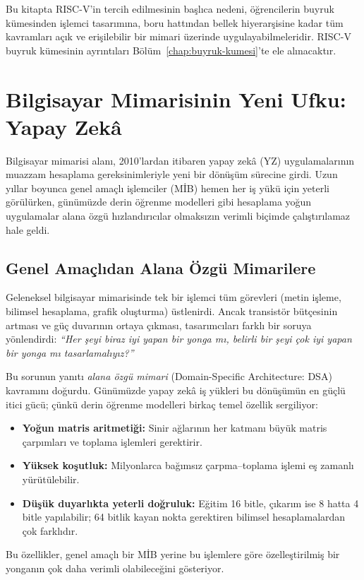 Bu kitapta RISC-V'in tercih edilmesinin başlıca nedeni, öğrencilerin buyruk kümesinden işlemci tasarımına, boru hattından bellek hiyerarşisine kadar tüm kavramları açık ve erişilebilir bir mimari üzerinde uygulayabilmeleridir. RISC-V buyruk kümesinin ayrıntıları Bölüm~\ref{chap:buyruk-kumesi}'te ele alınacaktır.


\section{Bilgisayar Mimarisinin Yeni Ufku: Yapay Zekâ}
\label{sec:yapay-zeka-ufku}

Bilgisayar mimarisi alanı, 2010'lardan itibaren yapay zekâ (YZ) uygulamalarının muazzam hesaplama gereksinimleriyle yeni bir dönüşüm sürecine girdi. Uzun yıllar boyunca genel amaçlı işlemciler (MİB) hemen her iş yükü için yeterli görülürken, günümüzde derin öğrenme modelleri gibi hesaplama yoğun uygulamalar alana özgü hızlandırıcılar olmaksızın verimli biçimde çalıştırılamaz hale geldi.


\subsection{Genel Amaçlıdan Alana Özgü Mimarilere}
\label{sec:genel-alana-ozgu}

Geleneksel bilgisayar mimarisinde tek bir işlemci tüm görevleri (metin işleme, bilimsel hesaplama, grafik oluşturma) üstlenirdi. Ancak transistör bütçesinin artması ve güç duvarının ortaya çıkması, tasarımcıları farklı bir soruya yönlendirdi: \emph{``Her şeyi biraz iyi yapan bir yonga mı, belirli bir şeyi çok iyi yapan bir yonga mı tasarlamalıyız?''}

Bu sorunun yanıtı \emph{alana özgü mimari} (Domain-Specific Architecture: DSA) kavramını doğurdu. Günümüzde yapay zekâ iş yükleri bu dönüşümün en güçlü itici gücü; çünkü derin öğrenme modelleri birkaç temel özellik sergiliyor:
\begin{itemize}
    \item \textbf{Yoğun matris aritmetiği:} Sinir ağlarının her katmanı büyük matris çarpımları ve toplama işlemleri gerektirir.
    \item \textbf{Yüksek koşutluk:} Milyonlarca bağımsız çarpma--toplama işlemi eş zamanlı yürütülebilir.
    \item \textbf{Düşük duyarlıkta yeterli doğruluk:} Eğitim 16 bitle, çıkarım ise 8 hatta 4 bitle yapılabilir; 64 bitlik kayan nokta gerektiren bilimsel hesaplamalardan çok farklıdır.
\end{itemize}
Bu özellikler, genel amaçlı bir MİB yerine bu işlemlere göre özelleştirilmiş bir yonganın çok daha verimli olabileceğini gösteriyor.


